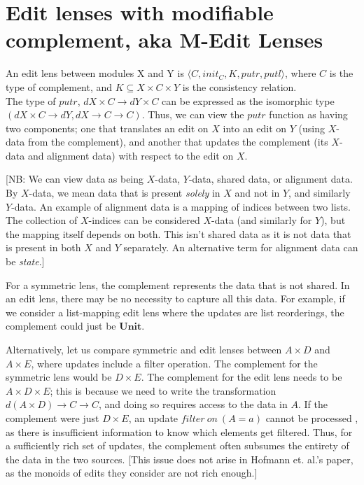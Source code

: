 \documentclass[a4paper,10pt]{article}
\title{}
\author{}
\newcommand{\Unit}{\ensuremath{\mathbf{Unit}}}
\begin{document}
\maketitle

\section{Edit lenses with modifiable complement, aka M-Edit Lenses}
An edit lens between modules X and Y is $\langle C, init_C, K, putr, putl \rangle$, where $C$ is the type of complement, and $K \subseteq X \times C \times Y$ is the consistency relation. \\
The type of $putr$, $dX \times C \to dY \times C$ can be expressed as the isomorphic type $(dX \times C \to dY, dX \to C \to C)$. Thus, we can view the $putr$ function as having two components; one that translates an edit on $X$ into an edit on $Y$ (using $X$-data from the complement), and another that updates the complement (its $X$-data and alignment data) with respect to the edit on $X$.

[NB: We can view data as being $X$-data, $Y$-data, shared data, or alignment data. By $X$-data, we mean data that is present \emph{solely} in $X$ and not in $Y$, and similarly $Y$-data. An example of alignment data is a mapping of indices between two lists. The collection of $X$-indices can be considered $X$-data (and similarly for $Y$), but the mapping itself depends on both. This isn't shared data as it is not data that is present in both $X$ and $Y$ separately. An alternative term for alignment data can be \emph{state}.]

For a symmetric lens, the complement represents the data that is not shared. In an edit lens, there may be no necessity to capture all this data. For example, if we consider a list-mapping edit lens where the updates are list reorderings, the complement could just be \Unit. 

Alternatively, let us compare symmetric and edit lenses between $A \times D$ and $A \times E$, where updates include a filter operation. The complement for the symmetric lens would be $D \times E$. 
The complement for the edit lens needs to be $A \times D \times E$; this is because we need to write the transformation $d(A \times D) \to C \to C$, and doing so requires access to the data in $A$. If the complement were just $D \times E$, an update $filter~on~(A=a)$ cannot be processed , as there is insufficient information to know which elements get filtered.
Thus, for a sufficiently rich set of updates, the complement often subsumes the entirety of the data in the two sources.
[This issue does not arise in Hofmann et. al.'s paper, as the monoids of edits they consider are not rich enough.]
\end{document}

